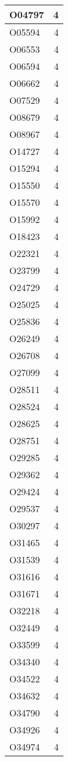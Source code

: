 \documentclass[
]{book}
\theoremstyle{definition}
\theoremstyle{definition}
\theoremstyle{definition}
\theoremstyle{definition}
\theoremstyle{remark}
\begin{document}
\begin{table}
\begin{tabular}{l|r}
\hline
O04797 & 4\\
\hline
O05594 & 4\\
\hline
O06553 & 4\\
\hline
O06594 & 4\\
\hline
O06662 & 4\\
\hline
O07529 & 4\\
\hline
O08679 & 4\\
\hline
O08967 & 4\\
\hline
O14727 & 4\\
\hline
O15294 & 4\\
\hline
O15550 & 4\\
\hline
O15570 & 4\\
\hline
O15992 & 4\\
\hline
O18423 & 4\\
\hline
O22321 & 4\\
\hline
O23799 & 4\\
\hline
O24729 & 4\\
\hline
O25025 & 4\\
\hline
O25836 & 4\\
\hline
O26249 & 4\\
\hline
O26708 & 4\\
\hline
O27099 & 4\\
\hline
O28511 & 4\\
\hline
O28524 & 4\\
\hline
O28625 & 4\\
\hline
O28751 & 4\\
\hline
O29285 & 4\\
\hline
O29362 & 4\\
\hline
O29424 & 4\\
\hline
O29537 & 4\\
\hline
O30297 & 4\\
\hline
O31465 & 4\\
\hline
O31539 & 4\\
\hline
O31616 & 4\\
\hline
O31671 & 4\\
\hline
O32218 & 4\\
\hline
O32449 & 4\\
\hline
O33599 & 4\\
\hline
O34340 & 4\\
\hline
O34522 & 4\\
\hline
O34632 & 4\\
\hline
O34790 & 4\\
\hline
O34926 & 4\\
\hline
O34974 & 4\\

\end{tabular}
\end{table}
\end{document}
